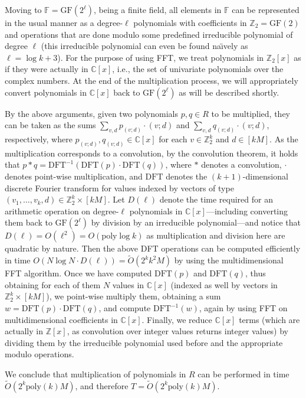\documentclass{llncs}
\newcommand{\DFT}{\mathrm{DFT}}
\newcommand{\poly}{\mathrm{poly}}
\newcommand{\FF}{\mathbb{F}}
\newcommand{\ZZ}{\mathbb{Z}}
\newcommand{\CC}{\mathbb{C}}
\newcommand{\GF}{\mathrm{GF}}
\begin{document}
Moving to $\FF=\GF(2^\ell)$, being a finite field, all elements in $\FF$ can be represented in the usual manner as a degree-$\ell$ polynomials with coefficients in $\ZZ_2=\GF(2)$ and operations that are done modulo some predefined irreducible polynomial of degree $\ell$ (this irreducible polynomial can even be found na\"{\i}vely as $\ell=\log k + 3$). For the purpose of using FFT,  we treat polynomials in $\ZZ_2[x]$ as if they were actually in $\CC[x]$, i.e., the set of univariate polynomials over the complex numbers. At the end of the multiplication process, we will appropriately convert polynomials in $\CC[x]$ back to $\GF(2^\ell)$ as will be described shortly.

By the above arguments, given two polynomials $p,q \in R$ to be multiplied, they can be taken as the sums $\sum_{v,d}p_{(v;d)}\cdot(v;d)$ and $\sum_{v,d}q_{(v;d)}\cdot(v;d)$, respectively, where $p_{(v;d)}, q_{(v;d)} \in \CC[x]$ for each $v\in \ZZ_2^k$ and $d\in [kM]$. As the multiplication corresponds to a convolution, by the convolution theorem, it holds that $p * q = \DFT^{-1}(\DFT(p) \cdot \DFT(q))$, where $*$ denotes a convolution, $\cdot$ denotes point-wise multiplication, and $\DFT$ denotes the $(k+1)$-dimensional discrete Fourier transform for values indexed by vectors of type $(v_1,\ldots,v_k,d)\in \ZZ_2^k\times [kM]$. 
Let $D(\ell)$ denote the time required for an arithmetic operation on degree-$\ell$ polynomials in $\CC[x]$---including converting them back to $\GF(2^\ell)$ by division by an irreducible polynomial---and notice that $D(\ell) = O(\ell^2) = O(\poly\log k)$ as multiplication and division here are quadratic by nature.
Then the above DFT operations can be computed efficiently in time $O(N \log N \cdot D(\ell)) = \tilde{O}(2^k k^2 M)$ by using the multidimensional FFT algorithm.
Once we have computed $\DFT(p)$ and $\DFT(q)$, thus obtaining for each of them $N$ values in $\CC[x]$ (indexed as well by vectors in $\ZZ_2^k\times [kM]$), we point-wise multiply them, obtaining a sum $w = \DFT(p) \cdot \DFT(q)$, and compute $\DFT^{-1}(w)$, again by using FFT on multidimensional coefficients in $\CC[x]$. Finally, we reduce $\CC[x]$ terms (which are actually in $\ZZ[x]$, as convolution over integer values returns integer values) by dividing them by the irreducible polynomial used before and the appropriate modulo operations. 
 
We conclude that multiplication of polynomials in $R$ can be performed in time $\tilde{O}(2^k \poly(k) M )$, and therefore $T = \tilde{O}(2^k \poly(k) M)$.
\end{document}
